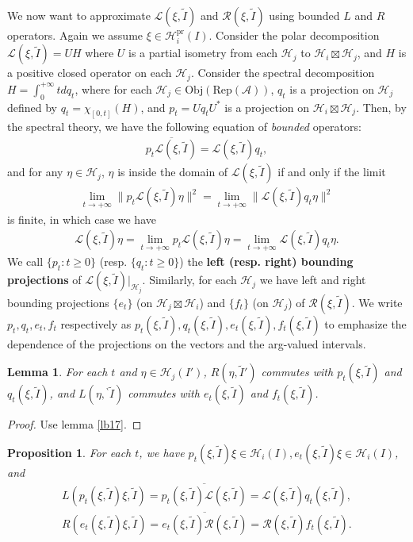 \documentclass[11pt,b5paper,notitlepage]{article}
\theoremstyle{definition}
\theoremstyle{plain}
\newtheorem{pp}[df]{Proposition}
\newtheorem{lm}[df]{Lemma}
\newcommand{\mc}{\mathcal}
\newcommand{\wtd}{\widetilde}
\newcommand{\ovl}{\overline}
\newcommand{\scr}{\mathscr}
\newcommand{\RepA}{\mathrm{Rep}(\mc A)}
\newcommand{\Obj}{\mathrm{Obj}}
\newcommand{\bpr}{{}^\backprime}
\newcommand{\pr}{\mathrm{pr}}
\numberwithin{equation}{subsection}
\begin{document}
We now want to approximate $\scr L(\xi,\wtd I)$ and $\scr R(\xi,\wtd I)$ using bounded $L$ and $R$ operators. Again we assume $\xi\in\mc H_i^\pr(I)$. Consider the polar decomposition $\scr L(\xi,\wtd I)=UH$ where $U$ is a partial isometry from each $\mc H_j$ to $\mc H_i\boxtimes\mc H_j$, and $H$ is a positive closed operator on each $\mc H_j$. Consider the spectral decomposition $H=\int_0^{+\infty}tdq_t$, where for each $\mc H_j\in\Obj(\RepA)$,  $q_t$ is a projection on $\mc H_j$ defined by $q_t=\chi_{[0,t]}(H)$, and $p_t=Uq_tU^*$  is a projection on $\mc H_i\boxtimes\mc H_j$. Then, by the spectral theory, we have the following equation of \emph{bounded} operators:
\begin{align*}
\ovl {p_t\scr L(\xi,\wtd I)}=\scr L(\xi,\wtd I)q_t,
\end{align*}
and for any $\eta\in\mc H_j$,  $\eta$ is inside the domain of $\scr L(\xi,\wtd I)$ if and only if the limit
\begin{align*}
\lim_{t\rightarrow+\infty}\lVert {p_t\scr L(\xi,\wtd I)}\eta \lVert^2=\lim_{t\rightarrow+\infty}\lVert {\scr L(\xi,\wtd I)}q_t\eta \lVert^2
\end{align*}
is finite, in which case we have
\begin{align*}
\scr L(\xi,\wtd I)\eta=\lim_{t\rightarrow+\infty} {p_t\scr L(\xi,\wtd I)}\eta =\lim_{t\rightarrow+\infty}{\scr L(\xi,\wtd I)}q_t\eta. 
\end{align*}
We call $\{p_t:t\geq0\}$ (resp. $\{q_t:t\geq0\}$) the \textbf{left (resp. right) bounding projections} of $\scr L(\xi,\wtd I)|_{\mc H_j}$.
Similarly, for each $\mc H_j$ we have left and right bounding projections $\{e_t\}$ (on $\mc H_j\boxtimes \mc H_i$)  and $\{f_t\}$ (on $\mc H_j$)  of $\scr R(\xi,\wtd I)$. We write $p_t,q_t,e_t,f_t$ respectively as $p_t(\xi,\wtd I),q_t(\xi,\wtd I),e_t(\xi,\wtd I),f_t(\xi,\wtd I)$ \index{pt@$p_t(\xi,\wtd I),q_t(\xi,\wtd I),e_t(\xi,\wtd I),f_t(\xi,\wtd I)$} to emphasize the dependence of the projections on the vectors and the arg-valued intervals.


\begin{lm}\label{lb19}
	For each $t$ and $\eta\in\mc H_j(I')$, $R(\eta,\wtd I')$ commutes with $p_t(\xi,\wtd I)$ and $q_t(\xi,\wtd I)$, and $L(\eta,\bpr\wtd I)$ commutes with $e_t(\xi,\wtd I)$ and $f_t(\xi,\wtd I)$.
\end{lm}
\begin{proof}
	Use lemma \ref{lb17}.
\end{proof}

\begin{pp}
	For each $t$, we have $p_t(\xi,\wtd I)\xi\in\mc H_i(I),e_t(\xi,\wtd I)\xi\in\mc H_i(I)$, and 
	\begin{gather}
	L(p_t(\xi,\wtd I)\xi,\wtd I)=\ovl{p_t(\xi,\wtd I)\scr L(\xi,\wtd I)}=\scr L(\xi,\wtd I)q_t(\xi,\wtd I),\\
	R(e_t(\xi,\wtd I)\xi,\wtd I)=\ovl{e_t(\xi,\wtd I)\scr R(\xi,\wtd I)}=\scr R(\xi,\wtd I)f_t(\xi,\wtd I).
	\end{gather}
\end{pp}
\end{document}
